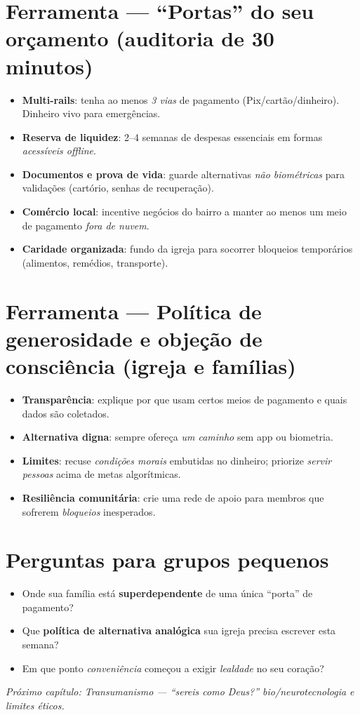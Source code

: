 \section{Ferramenta --- ``Portas'' do seu orçamento (auditoria de 30 minutos)}
\begin{checklist}
\begin{itemize}[leftmargin=*,noitemsep]
  \item \textbf{Multi-rails}: tenha ao menos \emph{3 vias} de pagamento (Pix/cartão/dinheiro). Dinheiro vivo para emergências.
  \item \textbf{Reserva de liquidez}: 2--4 semanas de despesas essenciais em formas \emph{acessíveis offline}.
  \item \textbf{Documentos e prova de vida}: guarde alternativas \emph{não biométricas} para validações (cartório, senhas de recuperação).
  \item \textbf{Comércio local}: incentive negócios do bairro a manter ao menos um meio de pagamento \emph{fora de nuvem}.
  \item \textbf{Caridade organizada}: fundo da igreja para socorrer bloqueios temporários (alimentos, remédios, transporte).
\end{itemize}
\end{checklist}

\section{Ferramenta --- Política de generosidade e objeção de consciência (igreja e famílias)}
\begin{checklist}[title={Princípios práticos}]
\begin{itemize}[leftmargin=*,noitemsep]
  \item \textbf{Transparência}: explique por que usam certos meios de pagamento e quais dados são coletados.
  \item \textbf{Alternativa digna}: sempre ofereça \emph{um caminho} sem app ou biometria.
  \item \textbf{Limites}: recuse \emph{condições morais} embutidas no dinheiro; priorize \emph{servir pessoas} acima de metas algorítmicas.
  \item \textbf{Resiliência comunitária}: crie uma rede de apoio para membros que sofrerem \emph{bloqueios} inesperados.
\end{itemize}
\end{checklist}

\section{Perguntas para grupos pequenos}
\begin{itemize}[leftmargin=*,noitemsep]
  \item Onde sua família está \textbf{superdependente} de uma única ``porta'' de pagamento?
  \item Que \textbf{política de alternativa analógica} sua igreja precisa escrever esta semana?
  \item Em que ponto \emph{conveniência} começou a exigir \emph{lealdade} no seu coração?
\end{itemize}

\bigskip
\noindent\textit{Próximo capítulo: Transumanismo --- ``sereis como Deus?'' bio/neurotecnologia e limites éticos.}
